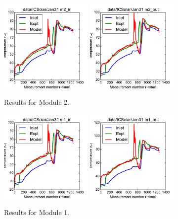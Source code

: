 \documentclass{article}
\begin{document}
\clearpage
\begin{figure}[!ht]
\centering
\includegraphics[width=0.4\textwidth]{../../data/ICSolar/images/Jan31_m2_in.pdf}\hspace{0.05\textwidth}
\includegraphics[width=0.4\textwidth]{../../data/ICSolar/images/Jan31_m2_out.pdf}\hspace{0.05\textwidth}\\
\caption{Results for Module 2.}\end{figure}
\begin{figure}[!ht]
\centering
\includegraphics[width=0.4\textwidth]{../../data/ICSolar/images/Jan31_m1_in.pdf}\hspace{0.05\textwidth}
\includegraphics[width=0.4\textwidth]{../../data/ICSolar/images/Jan31_m1_out.pdf}\hspace{0.05\textwidth}\\
\caption{Results for Module 1.}\end{figure}
\end{document}
